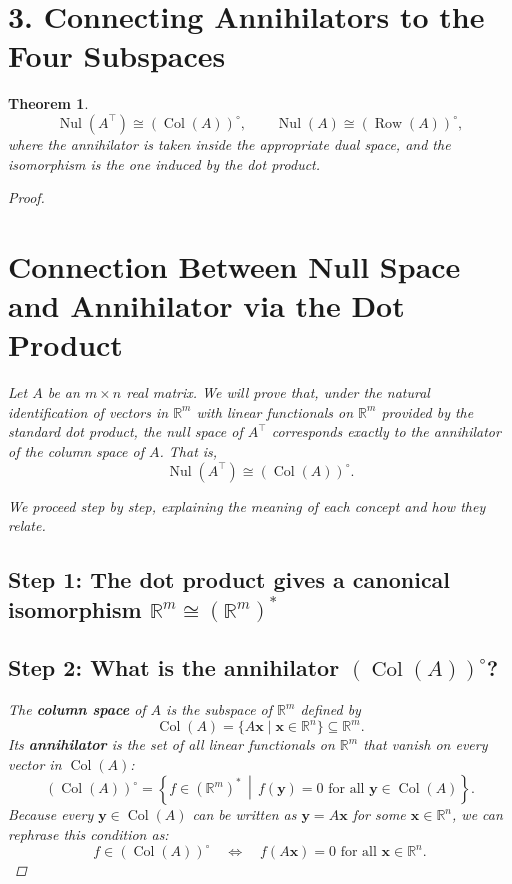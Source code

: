 \documentclass[11pt]{article}
\newcommand{\nul}{\operatorname{Nul}}
\newcommand{\col}{\operatorname{Col}}
\newcommand{\row}{\operatorname{Row}}
\newcommand{\R}{\mathbb{R}}
\newtheorem{theorem}{Theorem}
\begin{document}
\section*{3. Connecting Annihilators to the Four Subspaces}





\begin{theorem} 
\[
\nul(A^\top) \cong (\col(A))^\circ, \qquad
\nul(A) \cong (\row(A))^\circ,
\]
where the annihilator is taken inside the appropriate dual space, and the isomorphism is the one induced by the dot product.
\begin{proof}
\medskip







\section*{Connection Between Null Space and Annihilator via the Dot Product}

Let $A$ be an $m \times n$ real matrix. We will prove that, under the natural identification of vectors in $\R^m$ with linear functionals on $\R^m$ provided by the standard dot product, the null space of $A^\top$ corresponds exactly to the annihilator of the column space of $A$. That is,
\[
\nul(A^\top) \cong (\col(A))^\circ.
\]

We proceed step by step, explaining the meaning of each concept and how they relate.

\subsection*{Step 1: The dot product gives a canonical isomorphism $\R^m \cong (\R^m)^*$}



\subsection*{Step 2: What is the annihilator $(\col(A))^\circ$?}

The \textbf{column space} of $A$ is the subspace of $\R^m$ defined by
\[
\col(A) = \{ A\mathbf{x} \mid \mathbf{x} \in \R^n \} \subseteq \R^m.
\]
Its \textbf{annihilator} is the set of all linear functionals on $\R^m$ that vanish on every vector in $\col(A)$:
\[
(\col(A))^\circ = \left\{ f \in (\R^m)^* \,\middle|\, f(\mathbf{y}) = 0 \text{ for all } \mathbf{y} \in \col(A) \right\}.
\]
Because every $\mathbf{y} \in \col(A)$ can be written as $\mathbf{y} = A\mathbf{x}$ for some $\mathbf{x} \in \R^n$, we can rephrase this condition as:
\[
f \in (\col(A))^\circ \quad \Longleftrightarrow \quad f(A\mathbf{x}) = 0 \text{ for all } \mathbf{x} \in \R^n.
\]


\end{proof}
\end{theorem}
\end{document}
